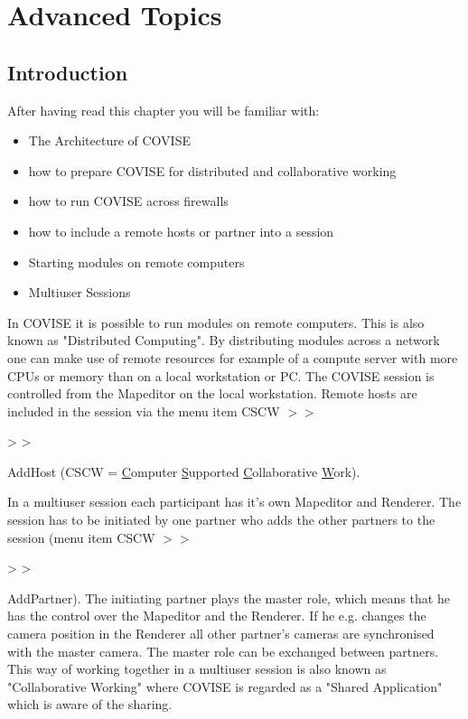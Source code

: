 
\begin{htmlonly}

\end{htmlonly}


\startdocument
\chapter{Advanced Topics}
\label{AdvancedTopics}

\section{Introduction}

After having read this chapter you will be familiar with:

\begin{itemize}
\item The Architecture of COVISE
\item how to prepare COVISE for distributed and collaborative working
\item how to run COVISE across firewalls
\item how to include a remote hosts or partner into a session
\item Starting modules on remote computers
\item Multiuser Sessions
\end{itemize}

In COVISE it is possible to run modules on remote computers. This is also known as 
"Distributed Computing". By distributing modules across a network one can make use 
of remote resources for example of a compute server with more CPUs or memory than on a 
local workstation or PC. The COVISE session is controlled from the Mapeditor on the
local workstation. Remote hosts are included in the session via the menu item 
CSCW \latexonly $>>$ \endlatexonly \begin{htmlonly} > > \end{htmlonly} AddHost (CSCW = \underline{C}omputer
\underline{S}upported \underline{C}ollaborative \underline{W}ork).

In a multiuser session each participant has it's own Mapeditor and Renderer. The 
session has to be initiated by one partner who adds the other partners to the 
session (menu item CSCW \latexonly $>>$ \endlatexonly \begin{htmlonly}> > \end{htmlonly} AddPartner). The initiating partner plays the master role, 
which means that he has the control over the Mapeditor and the Renderer. If he e.g. 
changes the camera position in the Renderer all other partner's cameras are synchronised 
with the master camera. The master role can be exchanged between partners. This way of 
working together in a multiuser session is also known as "Collaborative Working" where 
COVISE is regarded as a "Shared Application" which is aware of the sharing.

